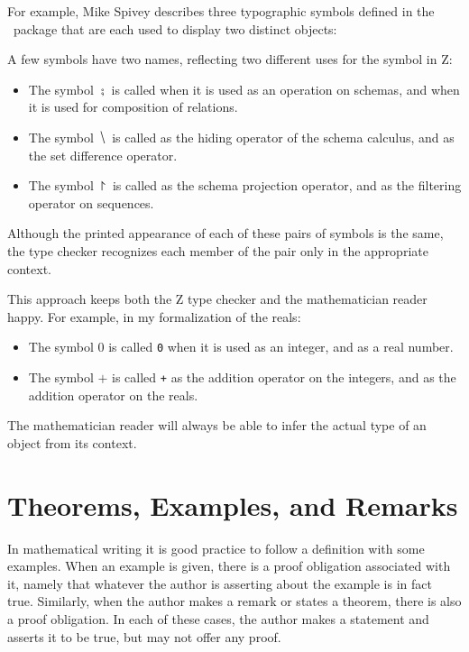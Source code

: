 \documentclass{amsart}
\begin{document}
For example, Mike Spivey \cite{spivey-fm} describes three typographic symbols defined in the \fuzz\ package 
that are each used to display two distinct objects:
\begin{displayquote}
A few symbols have two names, reflecting two different uses for the
symbol in Z:
\begin{itemize}
\item The symbol $\semi$ is called 
 when it is used as an operation on schemas, and 
 when it is used for composition of relations.
\item The symbol $\hide$ is called
 as the hiding operator of the schema calculus, and 
 as the set difference operator. 
\item The symbol $\project$ is called
 as the schema projection operator, and 
 as the filtering operator on sequences.
\end{itemize}
Although the printed appearance of
each of these pairs of symbols is the same, the type checker
recognizes each member of the pair only in the appropriate
\hbox{context}.
\end{displayquote}
This approach keeps both the Z type checker and the mathematician reader happy.
For example, in my formalization of the reals:
\begin{itemize} 
\item The symbol $0$ is called 
\texttt{0} when it is used as an integer, and 
 as a real number.
\item The symbol $+$ is called 
\texttt{+} as the addition operator on the integers, and
 as the addition operator on the reals.
\end{itemize}
The mathematician reader will always be able to infer the actual type of an object from its context.

\section{Theorems, Examples, and Remarks}

In mathematical writing it is good practice to follow a definition with some examples.
When an example is given, there is a proof obligation associated with it,
namely that whatever the author is asserting about the example is in fact true.
Similarly, when the author makes a remark or states a theorem, there is also a proof obligation.
In each of these cases, the author makes a statement and asserts it to be true, but may not offer any proof.
\end{document}
